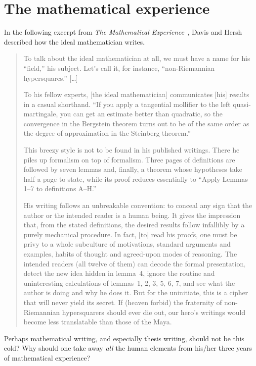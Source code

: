 \documentclass{bhamthesis}
\theoremstyle{definition}
\newcommand{\bktitle}[1]{\textit{#1}}
\begin{document}
\section{The mathematical experience}
In the following excerpt from \bktitle{The Mathematical
Experience}~\cite[pp.~34--37]{book:math-exp}, Davis and Hersh
described how the ideal mathematician writes.
\begin{quotation}
 To talk about the ideal mathematician at all, we must have a name
 for his ``field,'' his subject.  Let's call it, for instance,
 ``non-Riemannian hypersquares.''  [\ldots]

 To his fellow experts, [the ideal mathematician] communicates
 [his] results in a casual shorthand.  ``If you apply a tangential
 mollifier to the left quasi-martingale, you can get an estimate
 better than quadratic, so the convergence in the Bergstein
 theorem turns out to be of the same order as the degree of
 approximation in the Steinberg theorem.''

 This breezy style is not to be found in his published writings.
 There he piles up formalism on top of formalism.  Three pages of
 definitions are followed by seven lemmas and, finally, a theorem
 whose hypotheses take half a page to state, while its proof
 reduces essentially to ``Apply  Lemmas 1--7 to definitions
 A--H.''

 His writing follows an unbreakable convention: to conceal any
 sign that the author or the intended reader is a human being.  It
 gives the impression that, from the stated definitions, the
 desired results follow infallibly by a purely mechanical
 procedure.  In fact, [to] read his proofs, one must be privy to a
 whole subculture of motivations, standard arguments and examples,
 habits of thought and agreed-upon modes of reasoning.  The
 intended readers (all twelve of them) can decode the formal
 presentation, detect the new idea hidden in lemma~4, ignore the
 routine and uninteresting calculations of lemmas~1, 2, 3, 5, 6,
 7, and see what the author is doing and why he does it.  But for
 the uninitiate, this is a cipher that will never yield its
 secret.  If (heaven forbid) the fraternity of non-Riemannian
 hypersquarers should ever die out, our hero's writings would
 become less translatable than those of the Maya.
\end{quotation}
Perhaps mathematical writing, and especially thesis writing,
should not be this cold?  Why should one take away \emph{all} the
human elements from his/her three years of mathematical
experience?
\end{document}
